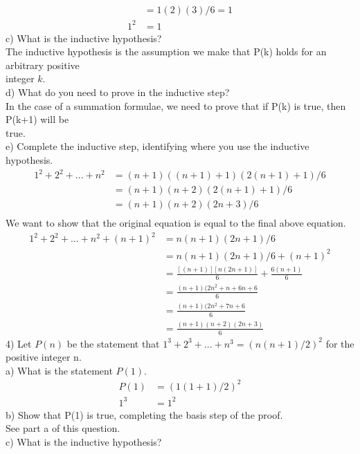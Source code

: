 \documentclass{article}
\begin{document}
\begin{flushleft}
\begin{align*}
&= 1(2)(3) / 6 = 1 \\
1^2 &= 1 
\end{align*}
\setlength\parindent{24pt}c) What is the inductive hypothesis? \\
\setlength\parindent{24pt} The inductive hypothesis is the assumption we make that P(k) holds for an arbitrary positive \\integer $k$.   \\
\setlength\parindent{0pt}d) What do you need to prove in the inductive step? \\
\setlength\parindent{24pt} In the case of a summation formulae, we need to prove that if P(k) is true, then P(k+1) will be \\true.  \\
\setlength\parindent{0pt}e) Complete the inductive step, identifying where you use the inductive hypothesis.\\
\begin{align*}
1^2 + 2^2 + . . . + n^2 &= (n+1)((n+1)+1)(2(n+1)+1) / 6 \\
&= (n+1)(n+2)(2(n+1) + 1) / 6 \\
&= (n+1)(n+2)(2n+3) / 6 \\
\end{align*}
We want to show that the original equation is equal to the final above equation.
\begin{align*}
1^2 + 2^2 + . . . + n^2 + (n+1)^2 &= n(n+1)(2n+1)/6 \\
&= n(n+1)(2n+1)/6 + (n+1)^2 \\
&= \frac{[(n+1)][n(2n+1)]}{6} + \frac{6(n+1)}{6} \\
&= \frac{(n+1)(2n^2+n+6n+6}{6} \\
&= \frac{(n+1)(2n^2+7n+6}{6} \\
&= \frac{(n+1)(n+2)(2n+3)}{6}
\end{align*}
\setlength\parindent{0pt}4) Let $P(n)$ be the statement that $1^3 + 2^3 + ... + n^3 = (n(n+1)/2)^2$ for the positive integer n. \\
\setlength\parindent{0pt}a) What is the statement $P(1)$.
\begin{align*}
P(1) &= (1(1+1)/2)^2 \\
1^3 &= 1^2 
\end{align*}
\setlength\parindent{0pt}b) Show that P(1) is true, completing the basis step of the proof.  \\
\setlength\parindent{24pt} See part a of this question. \\
\setlength\parindent{0pt}c) What is the inductive hypothesis? 

\end{flushleft}
\end{document}
